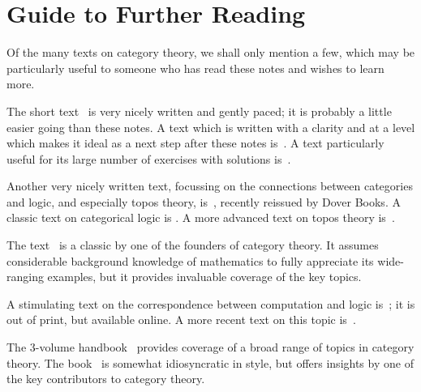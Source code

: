 \documentclass{svmult}
\begin{document}
\section{Guide to Further Reading}
Of the many texts on category theory, we shall only mention a few, which may be particularly useful to someone who has read these notes and wishes to learn more.

The short text~\cite{Pie} is very nicely written and gently paced; it is probably a little easier going than these notes.
A text which is written with a clarity and at a level which makes it ideal as a next step after these notes is~\cite{HS}. A text particularly useful for its large number of exercises with solutions is~\cite{BW}.

Another very nicely written text, focussing on the connections between categories and logic, and especially topos theory, is~\cite{Gol}, recently reissued by Dover Books. A classic text on categorical logic is \cite{LS}. A more advanced text on topos theory is~\cite{MacM}.

The text~\cite{Mac} is a classic by one of the founders of category theory. It assumes considerable background knowledge of mathematics to fully appreciate its wide-ranging examples, but it provides invaluable coverage of the key topics.

A stimulating text on the correspondence between computation and logic is~\cite{PT}; it  is out of print, but available online. A more recent  text on this topic is~\cite{CH}.

The 3-volume handbook~\cite{Bor} provides coverage of a broad range of topics in category theory.
The book~\cite{LS2} is somewhat idiosyncratic in style, but offers insights by one of the key contributors to category theory.
\end{document}
